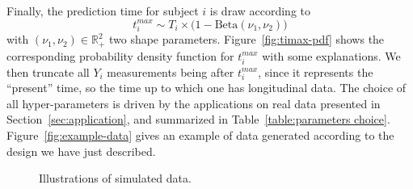 \documentclass[11pt]{article}
\newcommand{\R}{\mathds R}
\begin{document}
Finally, the prediction time for subject $i$ is draw according to 
\begin{equation}
  \label{eq:law-t_i^max}
  t_i^{max} \sim T_i \times \big(1 - \text{Beta}(\nu_1, \nu_2)\big) 
\end{equation}
with $(\nu_1, \nu_2) \in \R_+^2$ two shape parameters. Figure~\ref{fig:timax-pdf} shows the corresponding probability density function for $t_i^{max}$ with some explanations.
We then truncate all $Y_i$ measurements being after $t_i^{max}$, since it represents the ``present'' time, so the time up to which one has longitudinal data.
The choice of all hyper-parameters is driven by the applications on real data presented in Section~\ref{sec:application}, and summarized in Table~\ref{table:parameters choice}. Figure~\ref{fig:example-data} gives an example of data generated according to the design we have just described.
\begin{table}[htb]
\caption{Hyper-parameter choices for simulation. Let us also precise that we take $n \in [200, 4000]$ and $(p, L) \in [3, 300]^2$.
\label{table:parameters choice}}
\centering
{}
\end{table}
\begin{figure}[!htb]
\centering
{}
\hspace{.02\textwidth}
\caption{Illustrations of simulated data.}
\end{figure}
\end{document}
